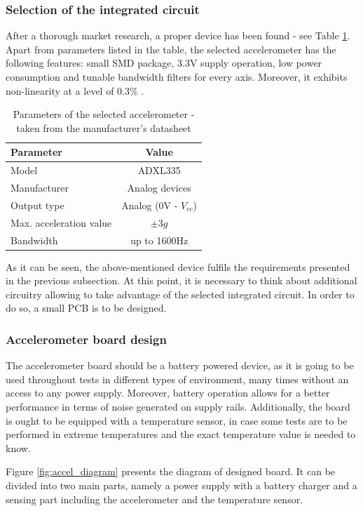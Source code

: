 \documentclass[12pt,a4paper]{article}
\begin{document}
\subsubsection{Selection of the integrated circuit}
After a thorough market research, a proper device has been found - see Table \ref{tab:adxl_params}. Apart from parameters listed in the table, the selected accelerometer has the following features: small SMD package, 3.3V supply operation, low power consumption and tunable bandwidth filters for every axis. Moreover, it exhibits non-linearity at a level of 0.3$\%$ \cite{ADXL}.
\par

\begin{table}[ht!]
\begin{tabular}{|l|c|}
\hline
\textbf{Parameter}		& \textbf{Value} 	\\ \hline
Model  					& ADXL335         	\\ \hline
Manufacturer        	& Analog devices	\\ \hline
Output type           	& Analog (0V - $V_{cc}$)  			\\ \hline
Max. acceleration value &  $\pm{3}g$		\\ \hline
Bandwidth 				&  up to 1600Hz		\\ \hline
\end{tabular}
\caption{Parameters of the selected accelerometer - taken from the manufacturer's datasheet \cite{ADXL}}
\label{tab:adxl_params}
\end{table}

As it can be seen, the above-mentioned device fulfils the requirements presented in the previous subsection. At this point, it is necessary to think about additional circuitry allowing to take advantage of the selected integrated circuit. In order to do so, a small PCB is to be designed.
\par

\subsubsection{Accelerometer board design}
The accelerometer board should be a battery powered device, as it is going to be used throughout tests in different types of environment, many times without an access to any power supply. Moreover, battery operation allows for a better performance in terms of noise generated on supply rails. Additionally, the board is ought to be equipped with a temperature sensor, in case some tests are to be performed in extreme temperatures and the exact temperature value is needed to know.
\par
Figure \ref{fig:accel_diagram} presents the diagram of designed board. It can be divided into two main parts, namely a power supply with a battery charger and a sensing part including the accelerometer and the temperature sensor.
\par
\end{document}
